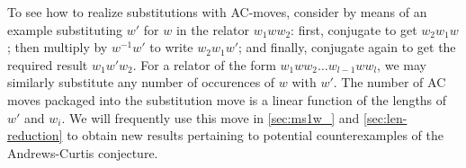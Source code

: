 To see how to realize substitutions with AC-moves, consider by means of an example substituting $w'$ for $w$ in the relator $w_1ww_2$: first, conjugate to get $w_2w_1w$; then multiply by $w^{-1}w'$ to write $w_2w_1w'$; and finally, conjugate again to get the required result $w_1w'w_2$. For a relator of the form $w_1 w w_2 \dots w_{l-1} w w_l$, we may similarly substitute any number of occurences of $w$ with $w'$. The number of AC moves packaged into the substitution move is a linear function of the lengths of $w'$ and $w_i$.
We will frequently use this move in \cref{sec:ms1w_} and \cref{sec:len-reduction} to obtain new results pertaining to potential counterexamples of the Andrews-Curtis conjecture.


